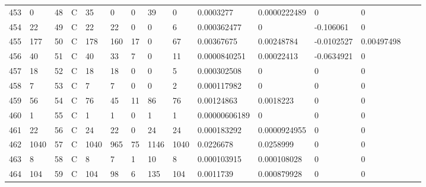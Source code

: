 \begin{longtable}{lllllllllllllll}
	453 & 0                 & 48  & C   & 35                & 0                 & 0                 & 39   & 0          & 0.0003277      & 0.0000222489   & 0             & 0            \\
	454 & 22                & 49  & C   & 22                & 22                & 0                 & 0    & 6          & 0.000362477    & 0              & -0.106061     & 0            \\
	455 & 177               & 50  & C   & 178               & 160               & 17                & 0    & 67         & 0.00367675     & 0.00248784     & -0.0102527    & 0.00497498   \\
	456 & 40                & 51  & C   & 40                & 33                & 7                 & 0    & 11         & 0.0000840251   & 0.00022413     & -0.0634921    & 0            \\
	457 & 18                & 52  & C   & 18                & 18                & 0                 & 0    & 5          & 0.000302508    & 0              & 0             & 0            \\
	458 & 7                 & 53  & C   & 7                 & 7                 & 0                 & 0    & 2          & 0.000117982    & 0              & 0             & 0            \\
	459 & 56                & 54  & C   & 76                & 45                & 11                & 86   & 76         & 0.00124863     & 0.0018223      & 0             & 0            \\
	460 & 1                 & 55  & C   & 1                 & 1                 & 0                 & 1    & 1          & 0.00000606189  & 0              & 0             & 0            \\
	461 & 22                & 56  & C   & 24                & 22                & 0                 & 24   & 24         & 0.000183292    & 0.0000924955   & 0             & 0            \\
	462 & 1040              & 57  & C   & 1040              & 965               & 75                & 1146 & 1040       & 0.0226678      & 0.0258999      & 0             & 0            \\
	463 & 8                 & 58  & C   & 8                 & 7                 & 1                 & 10   & 8          & 0.000103915    & 0.000108028    & 0             & 0            \\
	464 & 104               & 59  & C   & 104               & 98                & 6                 & 135  & 104        & 0.0011739      & 0.000879928    & 0             & 0            \\

\end{longtable}
